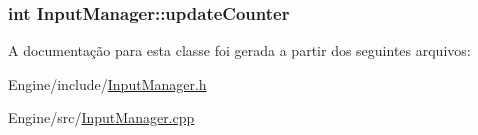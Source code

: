 \hypertarget{classInputManager_a96541a9ebd43184f92449f9daf94724f}{
\subsubsection[{update\+Counter}]{\setlength{\rightskip}{0pt plus 5cm}int Input\+Manager\+::update\+Counter\hspace{0.3cm}{\ttfamily [private]}}}\label{classInputManager_a96541a9ebd43184f92449f9daf94724f}


A documentação para esta classe foi gerada a partir dos seguintes arquivos\+:\begin{DoxyCompactItemize}
\item 
Engine/include/\hyperlink{InputManager_8h}{Input\+Manager.\+h}\item 
Engine/src/\hyperlink{InputManager_8cpp}{Input\+Manager.\+cpp}\end{DoxyCompactItemize}
